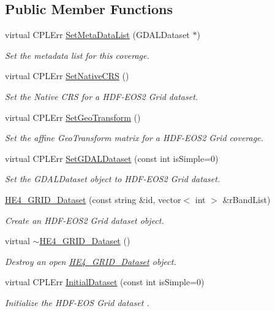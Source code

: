\subsection*{Public Member Functions}
\begin{DoxyCompactItemize}
\item 
virtual CPLErr \hyperlink{classHE4__GRID__Dataset_a553b804b33f2144f131305c3fdea617f}{SetMetaDataList} (GDALDataset $\ast$)
\begin{DoxyCompactList}\small\item\em Set the metadata list for this coverage. \end{DoxyCompactList}\item 
virtual CPLErr \hyperlink{classHE4__GRID__Dataset_a4b37c8d0d47359e11a2dd65fe35f472f}{SetNativeCRS} ()
\begin{DoxyCompactList}\small\item\em Set the Native CRS for a HDF-\/EOS2 Grid dataset. \end{DoxyCompactList}\item 
virtual CPLErr \hyperlink{classHE4__GRID__Dataset_a9afcba857134a8344231286c35a0db51}{SetGeoTransform} ()
\begin{DoxyCompactList}\small\item\em Set the affine GeoTransform matrix for a HDF-\/EOS2 Grid coverage. \end{DoxyCompactList}\item 
virtual CPLErr \hyperlink{classHE4__GRID__Dataset_a140e522053c1010df41e680ee2ded291}{SetGDALDataset} (const int isSimple=0)
\begin{DoxyCompactList}\small\item\em Set the GDALDataset object to HDF-\/EOS2 Grid dataset. \end{DoxyCompactList}\item 
\hyperlink{classHE4__GRID__Dataset_a920e2bb87732d8605f6379d5c7070036}{HE4\_\-GRID\_\-Dataset} (const string \&id, vector$<$ int $>$ \&rBandList)
\begin{DoxyCompactList}\small\item\em Create an HDF-\/EOS2 Grid dataset object. \end{DoxyCompactList}\item 
virtual \hyperlink{classHE4__GRID__Dataset_ae754eaebc441db441e05e0a5e9f9651c}{$\sim$HE4\_\-GRID\_\-Dataset} ()
\begin{DoxyCompactList}\small\item\em Destroy an open \hyperlink{classHE4__GRID__Dataset}{HE4\_\-GRID\_\-Dataset} object. \end{DoxyCompactList}\item 
virtual CPLErr \hyperlink{classHE4__GRID__Dataset_ae45769184c1b4453a81b7809107a6656}{InitialDataset} (const int isSimple=0)
\begin{DoxyCompactList}\small\item\em Initialize the HDF-\/EOS Grid dataset . \end{DoxyCompactList}\end{DoxyCompactItemize}
